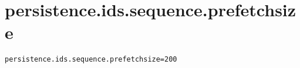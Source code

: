 \section{persistence.ids.sequence.prefetchsize}
\label{configuration:PersistenceIdsSequencePrefetchsize}
\ClearAPI
\TODO
{}
\begin{lstlisting}[style=Props,caption={Usage example for \textit{persistence.ids.sequence.prefetchsize}}]
persistence.ids.sequence.prefetchsize=200
\end{lstlisting}